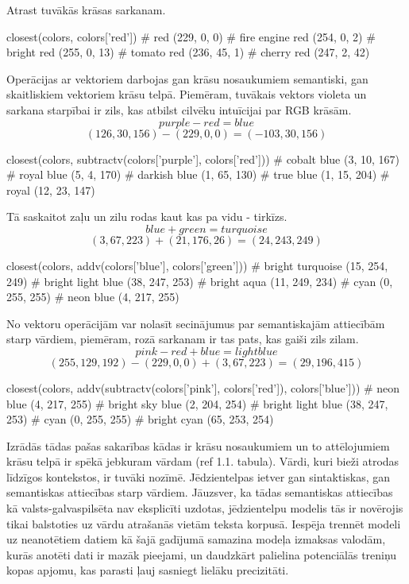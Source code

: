 Atrast tuvākās krāsas sarkanam.
\begin{python}
closest(colors, colors['red'])
# red (229, 0, 0)
# fire engine red (254, 0, 2)
# bright red (255, 0, 13)
# tomato red (236, 45, 1)
# cherry red (247, 2, 42)
\end{python}

Operācijas ar vektoriem darbojas gan krāsu nosaukumiem semantiski, gan skaitliskiem vektoriem krāsu telpā. Piemēram, tuvākais vektors violeta un sarkana starpībai ir zils, kas atbilst cilvēku intuīcijai par RGB krāsām.
$$purple - red = blue$$
$$(126, 30, 156) - (229, 0, 0) = (-103, 30, 156)$$
\begin{python}
closest(colors, subtractv(colors['purple'], colors['red']))
# cobalt blue (3, 10, 167)
# royal blue (5, 4, 170)
# darkish blue (1, 65, 130)
# true blue (1, 15, 204)
# royal (12, 23, 147)
\end{python}

Tā saskaitot zaļu un zilu rodas kaut kas pa vidu - tirkīzs.
$$blue + green = turquoise$$
$$(3, 67, 223) + (21, 176, 26) = (24, 243, 249)$$
\begin{python}
closest(colors, addv(colors['blue'], colors['green']))
# bright turquoise (15, 254, 249)
# bright light blue (38, 247, 253)
# bright aqua (11, 249, 234)
# cyan (0, 255, 255)
# neon blue (4, 217, 255)
\end{python}

No vektoru operācijām var nolasīt secinājumus par semantiskajām attiecībām starp vārdiem, piemēram, rozā sarkanam ir tas pats, kas gaiši zils zilam.
$$pink - red + blue = light blue$$
$$(255, 129, 192) - (229, 0, 0) + (3, 67, 223) = (29, 196, 415)$$
\begin{python}
closest(colors, addv(subtractv(colors['pink'], colors['red']), colors['blue']))
# neon blue (4, 217, 255)
# bright sky blue (2, 204, 254)
# bright light blue (38, 247, 253)
# cyan (0, 255, 255)
# bright cyan (65, 253, 254)
\end{python}



Izrādās tādas pašas sakarības kādas ir krāsu nosaukumiem un to attēlojumiem krāsu telpā ir spēkā jebkuram vārdam (ref 1.1. tabula). Vārdi, kuri bieži atrodas līdzīgos kontekstos, ir tuvāki nozīmē. Jēdzientelpas ietver gan sintaktiskas, gan semantiskas attiecības starp vārdiem. Jāuzsver, ka tādas semantiskas attiecības kā valsts-galvaspilsēta nav eksplicīti uzdotas, jēdzientelpu modelis tās ir novērojis tikai balstoties uz vārdu atrašanās vietām teksta korpusā. Iespēja trennēt modeli uz neanotētiem datiem kā šajā gadījumā samazina modeļa izmaksas valodām, kurās anotēti dati ir mazāk pieejami, un daudzkārt palielina potenciālās treniņu kopas apjomu, kas parasti ļauj sasniegt lielāku precizitāti.


